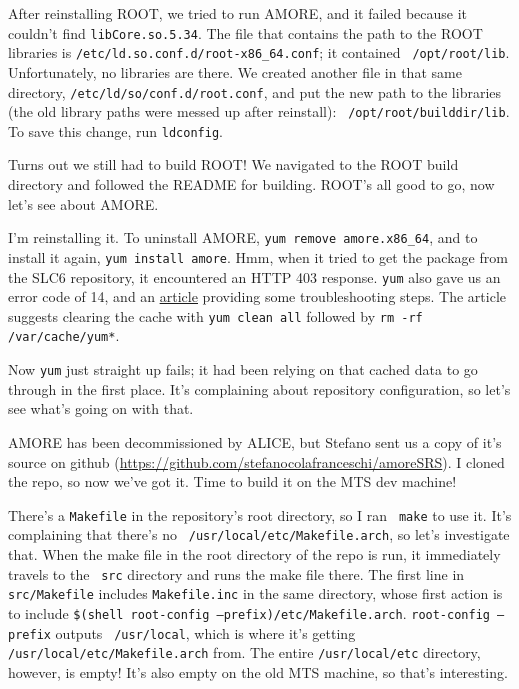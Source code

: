 \documentclass[12pt]{article}
\begin{document}
\qq After reinstalling ROOT, we tried to run AMORE, and it failed because it
couldn't find {\tt libCore.so.5.34}. The file that contains the path to the ROOT
libraries is {\tt /etc/ld.so.conf.d/root-x86\_64.conf}; it contained {\tt
  /opt/root/lib}. Unfortunately, no libraries are there. We created another file
in that same directory, {\tt /etc/ld/so/conf.d/root.conf}, and put the new path
to the libraries (the old library paths were messed up after reinstall): {\tt
  /opt/root/builddir/lib}. To save this change, run {\tt ldconfig}.

\qq Turns out we still had to build ROOT! We navigated to the ROOT build
directory and followed the README for building. ROOT's all good to go, now let's
see about AMORE. 

\qq I'm reinstalling it. To uninstall AMORE, {\tt yum remove amore.x86\_64}, and
to install it again, {\tt yum install amore}. Hmm, when it tried to get the
package from the SLC6 repository, it encountered an HTTP 403 response. {\tt yum}
also gave us an error code of 14, and an
\href{https://wiki.centos.org/yum-errors}{\underline{article}} providing some
troubleshooting steps. The article suggests clearing the cache with {\tt yum
  clean all} followed by {\tt rm -rf /var/cache/yum*}.

\qq Now {\tt yum} just straight up fails; it had been relying on that cached
data to go through in the first place. It's complaining about repository
configuration, so let's see what's going on with that.

\qq AMORE has been decommissioned by ALICE, but Stefano sent us a copy of it's
source on github (\url{https://github.com/stefanocolafranceschi/amoreSRS}). I
cloned the repo, so now we've got it. Time to build it on the MTS dev machine!

\qq There's a {\tt Makefile} in the repository's root directory, so I ran {\tt
  make} to use it. It's complaining that there's no {\tt
  /usr/local/etc/Makefile.arch}, so let's investigate that. When the make file
in the root directory of the repo is run, it immediately travels to the {\tt
  src} directory and runs the make file there. The first line in {\tt
  src/Makefile} includes {\tt Makefile.inc} in the same directory, whose first
action is to include {\tt \$(shell root-config
  --prefix)/etc/Makefile.arch}. {\tt root-config --prefix} outputs {\tt
  /usr/local}, which is where it's getting {\tt /usr/local/etc/Makefile.arch}
from. The entire {\tt /usr/local/etc} directory, however, is empty! It's also
empty on the old MTS machine, so that's interesting. 
\end{document}

